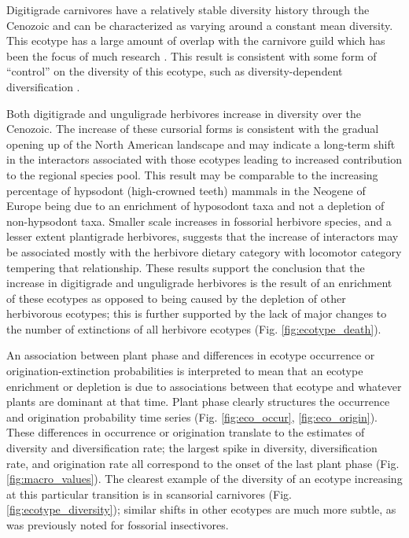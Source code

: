 \documentclass[12pt,letterpaper]{article}
\begin{document}
Digitigrade carnivores have a relatively stable diversity history through the Cenozoic and can be characterized as varying around a constant mean diversity. This ecotype has a large amount of overlap with the carnivore guild which has been the focus of much research \citep{Slater2015c,Valkenburgh1999,Pires2015a,Janis1993c}. This result is consistent with some form of ``control'' on the diversity of this ecotype, such as diversity-dependent diversification \citep{Slater2015c,Silvestro2015b,Valkenburgh1999}.

Both digitigrade and unguligrade herbivores increase in diversity over the Cenozoic. The increase of these cursorial forms is consistent with the gradual opening up of the North American landscape \citep{Blois2009,Stromberg2005,Graham2011a} and may indicate a long-term shift in the interactors associated with those ecotypes leading to increased contribution to the regional species pool. This result may be comparable to the increasing percentage of hypsodont (high-crowned teeth) mammals in the Neogene of Europe being due to an enrichment of hyposodont taxa and not a depletion of non-hypsodont taxa. Smaller scale increases in fossorial herbivore species, and a lesser extent plantigrade herbivores, suggests that the increase of interactors may be associated mostly with the herbivore dietary category with locomotor category tempering that relationship. These results support the conclusion that the increase in digitigrade and unguligrade herbivores is the result of an enrichment of these ecotypes as opposed to being caused by the depletion of other herbivorous ecotypes; this is further supported by the lack of major changes to the number of extinctions of all herbivore ecotypes (Fig. \ref{fig:ecotype_death}).

An association between plant phase and differences in ecotype occurrence or origination-extinction probabilities is interpreted to mean that an ecotype enrichment or depletion is due to associations between that ecotype and whatever plants are dominant at that time. Plant phase clearly structures the occurrence and origination probability time series (Fig. \ref{fig:eco_occur}, \ref{fig:eco_origin}). These differences in occurrence or origination translate to the estimates of diversity and diversification rate; the largest spike in diversity, diversification rate, and origination rate all correspond to the onset of the last plant phase (Fig. \ref{fig:macro_values}). The clearest example of the diversity of an ecotype increasing at this particular transition is in scansorial carnivores (Fig. \ref{fig:ecotype_diversity}); similar shifts in other ecotypes are much more subtle, as was previously noted for fossorial insectivores. 
\end{document}
